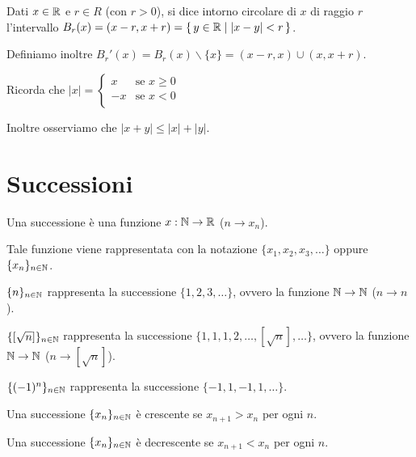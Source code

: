 \begin{definition}
Dati $x \in \mathbb R$ e $r \in R$ (con $r > 0$), si dice intorno circolare di $x$ di raggio $r$ l'intervallo $B_r(x) = (x-r, x+r) = \set{y \in \mathbb R| |x-y| < r}$.


Definiamo inoltre $B_r'(x) = B_r(x)\backslash\{x\} = (x-r, x) \cup (x, x+r)$.
\end{definition}

Ricorda che $|x| = 
\begin{cases} 
x & \mbox{se } x \ge 0 \\
-x & \mbox{se } x < 0 \\ 
\end{cases} $

Inoltre osserviamo che $|x+y| \le |x| + |y|$.

\section{Successioni}

Una successione è una funzione $x:\mathbb N \rightarrow \mathbb R$ ($n \rightarrow x_n$).

Tale funzione viene rappresentata con la notazione $\{x_1, x_2, x_3, \dots\}$ oppure $\{x_n\}_{n \in \mathbb N}$.

\begin{example}
$\{n\}_{n \in \mathbb N}$ rappresenta la successione $\{1, 2, 3, \dots \}$, ovvero la funzione $\mathbb N \rightarrow \mathbb N$ ($n \rightarrow n$).
\end{example}

\begin{example}
$\{[\sqrt{n}]\}_{n \in \mathbb N}$ rappresenta la successione $\{1, 1, 1, 2, \dots, [\sqrt{n}], \dots \}$, ovvero la funzione $\mathbb N \rightarrow \mathbb N$ ($n \rightarrow [\sqrt{n}]$).
\end{example}

\begin{example}
$\{(-1)^n\}_{n \in \mathbb N}$ rappresenta la successione $\{-1, 1, -1, 1, \dots \}$.
\end{example}

\begin{definition}
Una successione $\{x_n\}_{n \in \mathbb N}$ è crescente se $x_{n+1} > x_n$ per ogni $n$.
\end{definition}

\begin{definition}
Una successione $\{x_n\}_{n \in \mathbb N}$ è decrescente se $x_{n+1} < x_n$ per ogni $n$.
\end{definition}

